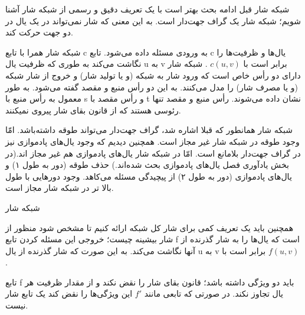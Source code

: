 \begin{itemframe}{شبکه شار}
\itm
قبل ادامه بحث بهتر است با یک تعریف دقیق و رسمی از شبکه شار آشنا شویم؛
\itm
شبکه شار یک گراف جهت‌دار است. به این معنی که شار نمی‌تواند در یک یال در دو جهت حرکت کند.

شبکه شار همرا با تابع c به ورودی مسئله داده می‌شود. تابع c یال‌ها و ظرفیت‌‌ها را نگاشت می‌کند به طوری که ظرفیت یال u به v برابر است با
$c(u, v)$ .
\itm
شبکه شار دارای دو رأس خاص است که ورود شار به شبکه (و یا تولید شار) و خروج از شار شبکه (و یا مصرف شار) را مدل می‌کنند. به این دو رأس منبع
و مقصد
گفته می‌شود. به طور معمول به رأس منبع با s و رأس مقصد با t نشان داده می‌شوند.
\itm
رأس منبع و مقصد تنها رئوسی هستند که از قانون بقای شار پیروی نمیکنند.
\end{itemframe}

\begin{itemframe}{شبکه شار}
\itm
همانطور که قبلا اشاره شد، گراف جهت‌دار می‌تواند طوقه داشته‌باشد. امّا وجود طوقه در شبکه شار غیر مجاز است.
\itm
همچنین دیدیم که وجود یال‌های پادموازی نیز در گراف جهت‌دار بلامانع است. امّا در شبکه شار یال‌های پادموازی هم غیر مجاز اند.(در بخش يادآوری فصل یال‌های پادموازی بحث شده‌اند.)
\itm
حذف طوقه (دور به طول ۱) و یال‌های پادموازی (دور به طول ۲) از پیچیدگی مسئله می‌کاهد.
\itm
وجود دورهایی با طول بالا تر در شبکه شار مجاز است.
\end{itemframe}

\begin{itemframe}{شبکه شار}

\itm
همچنین باید یک تعریف کمی برای شار کل شبکه ارائه کنیم تا مشخص شود منظور از شار بیشینه چیست؛
\itm
خروجی این مسئله کردن تابع f است که یال‌ها را به شار گذرنده از آنها نگاشت می‌کند. به این صورت که شار گذرنده از یال u به v برابر است با
$f(u, v)$ .

\itm
تابع f باید دو ويژگی داشته باشد؛ قانون بقای شار را نقض نکند و از مقدار ظرفیت هر یال تجاوز نکند. در صورتی که تابعی مانند
$f'$
این ویژگی‌ها را نقض کند یک تابع شار نیست.

\end{itemframe}


